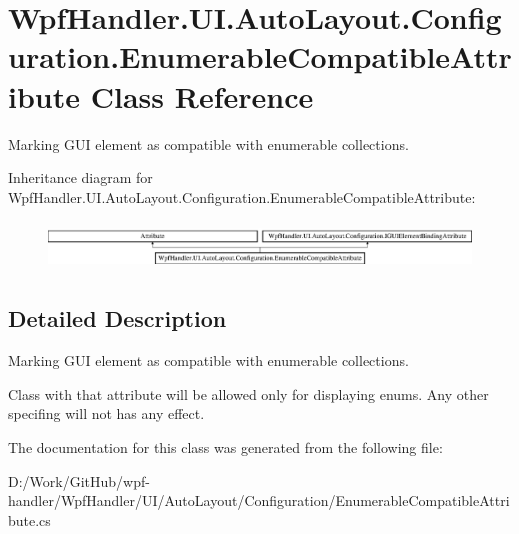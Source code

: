 \hypertarget{class_wpf_handler_1_1_u_i_1_1_auto_layout_1_1_configuration_1_1_enumerable_compatible_attribute}{}\section{Wpf\+Handler.\+U\+I.\+Auto\+Layout.\+Configuration.\+Enumerable\+Compatible\+Attribute Class Reference}
\label{class_wpf_handler_1_1_u_i_1_1_auto_layout_1_1_configuration_1_1_enumerable_compatible_attribute}


Marking G\+UI element as compatible with enumerable collections.  


Inheritance diagram for Wpf\+Handler.\+U\+I.\+Auto\+Layout.\+Configuration.\+Enumerable\+Compatible\+Attribute\+:\begin{figure}[H]
\begin{center}
\leavevmode
\includegraphics[height=1.302326cm]{d2/dc3/class_wpf_handler_1_1_u_i_1_1_auto_layout_1_1_configuration_1_1_enumerable_compatible_attribute}
\end{center}
\end{figure}


\subsection{Detailed Description}
Marking G\+UI element as compatible with enumerable collections. 

Class with that attribute will be allowed only for displaying enums. Any other specifing will not has any effect. 

The documentation for this class was generated from the following file\+:\begin{DoxyCompactItemize}
\item 
D\+:/\+Work/\+Git\+Hub/wpf-\/handler/\+Wpf\+Handler/\+U\+I/\+Auto\+Layout/\+Configuration/Enumerable\+Compatible\+Attribute.\+cs\end{DoxyCompactItemize}
